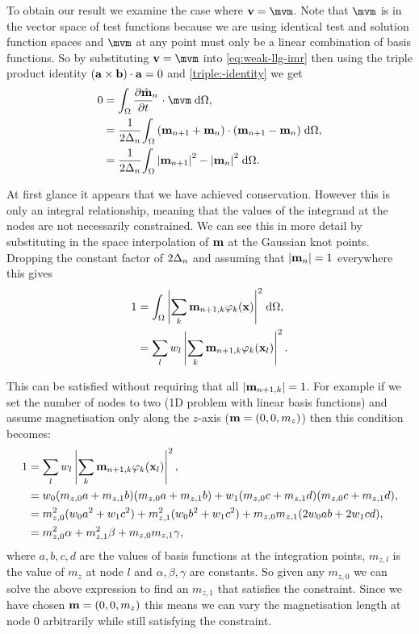 To obtain our result we examine the case where $\testv = \mvm$.
Note that $\mvm$ is in the vector space of test functions because we are using identical test and solution function spaces and $\mvm$ at any point must only be a linear combination of basis functions.
So by substituting $\testv = \mvm$ into \cref{eq:weak-llg-imr} then using the triple product identity $({\mathbf{a}} \times {\mathbf{b}}) \cdot {\mathbf{a}} = 0$ and \cref{triple:-identity} we get
\begin{equation}
  \label{eq:23}
  \begin{aligned}
    0 &= \ipg{\dmdtm}{\mvm}, \\
    &= \frac{1}{2\dtn} \intd{(\mv_{n+1} + \mv_{n}) \cdot (\mv_{n+1} - \mv_n)}, \\
    &= \frac{1}{2\dtn} \intd{\abs{\mv_{n+1}}^2 - \abs{\mv_{n}}^2}.
  \end{aligned}
\end{equation}

At first glance it appears that we have achieved conservation.
However this is only an integral relationship, meaning that the values of the integrand at the nodes are not necessarily constrained.
We can see this in more detail by substituting in the space interpolation of $\mathbf{m}$ at the Gaussian knot points.
Dropping the constant factor of $2\Delta_{n}$ and assuming that $\left|{\mathbf{m}_n} \right| = 1$ everywhere this gives
\begin{equation}
  \begin{aligned} 
    1 &= {\int_{\Omega} {\left|{\sum_k \mathbf{m}_{n+1, k} \varphi_k(\mathbf{x})} \right|^2} {\; \mathrm{{d}}} {\Omega}}, \\
    &= \sum_l w_l \left|{\sum_k \mathbf{m}_{n+1, k} \varphi_k(\mathbf{x}_l)} \right|^2.
  \end{aligned} 
\end{equation}

This can be satisfied without requiring that all $\left|{\mathbf{m}_{n+1, k}} \right| = 1$.
For example if we set the number of nodes to two (\ie 1D problem with linear basis functions) and assume magnetisation only along the $z$-axis (\ie  $\mathbf{m} = (0, 0, m_z)$) then this condition becomes:
\begin{equation}
  \begin{aligned}
    1 &= \sum_l w_l \left|{\sum_k \mathbf{m}_{n+1, k} \varphi_k(\mathbf{x}_l)} \right|^2, \\
    &= w_0 (m_{z,0} a + m_{z,1} b)(m_{z,0} a + m_{z,1} b) + w_1 (m_{z,0} c + m_{z,1} d)(m_{z,0} c + m_{z,1} d), \\
    &= m_{z,0}^2 (w_0 a^2 + w_1 c^2) + m_{z,1}^2 (w_0 b^2 + w_1 c^2) + m_{z,0} m_{z,1} (2w_0ab + 2w_1cd), \\
    &= m_{z,0}^2 \alpha + m_{z,1}^2 \beta + m_{z,0} m_{z,1} \gamma, \\
  \end{aligned}
\end{equation}
where $a,b,c,d$ are the values of basis functions at the integration points, $m_{z,l}$ is the value of $m_z$ at node $l$ and $\alpha, \beta, \gamma$ are constants.
So given any $m_{z,0}$ we can solve the above expression to find an $m_{z,1}$ that satisfies the constraint.
Since we have chosen $\mathbf{m} = (0, 0, m_z)$ this means we can vary the magnetisation length at node 0 arbitrarily while still satisfying the constraint.

